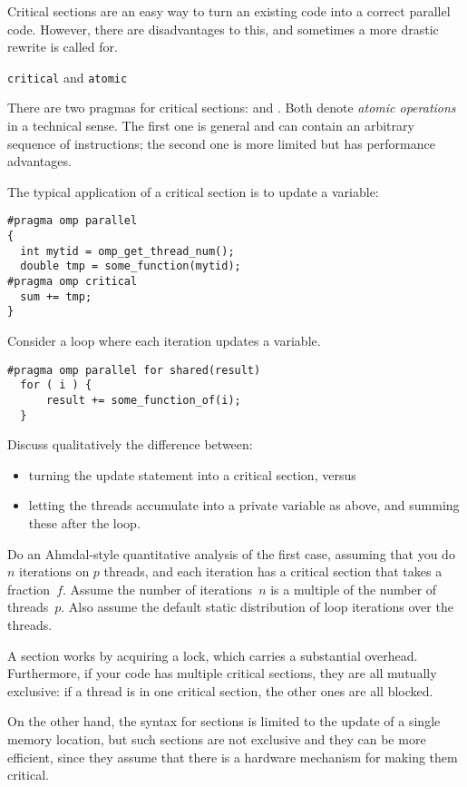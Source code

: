 Critical sections are an easy way to turn an existing code into a correct parallel code.
However, there are disadvantages to this, and sometimes a more drastic rewrite
is called for.

 {\texttt{critical} and \texttt{atomic}}
\label{sec:critical}

There are two pragmas for critical sections:  and .
Both denote \emph{atomic operations}
in a technical sense.
The first one is general and can contain an arbitrary sequence of instructions;
the second one is more limited but has performance advantages.

The typical application of a critical section is to update a variable:
\begin{lstlisting}
#pragma omp parallel
{
  int mytid = omp_get_thread_num();
  double tmp = some_function(mytid);
#pragma omp critical
  sum += tmp;
}
\end{lstlisting}

\begin{exercise}
  Consider  a loop where each iteration updates a variable.
\begin{lstlisting}
#pragma omp parallel for shared(result)
  for ( i ) {
      result += some_function_of(i);
  }
\end{lstlisting}
  Discuss qualitatively
  the difference between:
  \begin{itemize}
  \item  turning the update statement into a critical section, versus
  \item letting the threads accumulate into a private variable  as above,
    and summing these after the loop.
  \end{itemize}  
  Do an Ahmdal-style quantitative analysis of the first case, assuming
  that you do $n$ iterations on $p$ threads, and each iteration has a
  critical section that takes a fraction~$f$.  Assume the number of
  iterations~$n$ is a multiple of the number of threads~$p$. Also
  assume the default static distribution of loop iterations over the
  threads.
\end{exercise}

A  section works by acquiring a lock, which carries a substantial overhead.
Furthermore, if your code has multiple critical sections, they are all mutually exclusive:
if a thread is in one critical section, the other ones are all blocked.

On the other hand, the syntax for  sections is limited to the update
of a single memory location, but such sections
are not exclusive and they can be more efficient, since they assume that there is a hardware
mechanism for making them critical.

